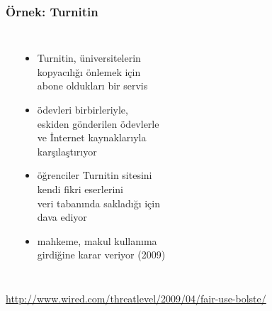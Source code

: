 \documentclass[dvipsnames]{beamer}
\theoremstyle{definition}
\theoremstyle{example}
\theoremstyle{plain}
\begin{document}
\begin{frame}
  \frametitle{Örnek: Turnitin}

  \begin{columns}
    \begin{center}
    \end{center}

    \begin{itemize}
      \item Turnitin, üniversitelerin\\
        kopyacılığı önlemek için\\
        abone oldukları bir servis
      \item ödevleri birbirleriyle,\\
        eskiden gönderilen ödevlerle\\
        ve İnternet kaynaklarıyla\\
        karşılaştırıyor
      \item öğrenciler Turnitin sitesini\\
        kendi fikri eserlerini\\
        veri tabanında sakladığı için\\
        dava ediyor
      \item mahkeme, makul kullanıma\\
        girdiğine karar veriyor (2009)
    \end{itemize}
  \end{columns}

  \medskip
  \tiny{\url{http://www.wired.com/threatlevel/2009/04/fair-use-bolste/}}\\
\end{frame}

%
\end{document}
